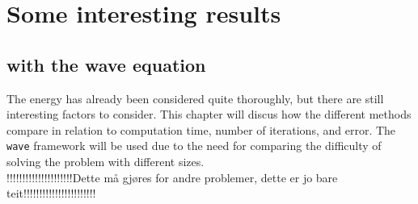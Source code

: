 \chapter{Some interesting results}

\section{with the wave equation}
The energy has already been considered quite thoroughly, but there are still interesting factors to consider. This chapter will discus how the different methods compare in relation to computation time, number of iterations, and error. The \texttt{wave} framework will be used due to the need for comparing the difficulty of solving the problem with different sizes.\\
!!!!!!!!!!!!!!!!!!!!!Dette må gjøres for andre problemer, dette er jo bare teit!!!!!!!!!!!!!!!!!!!!!!!\\




